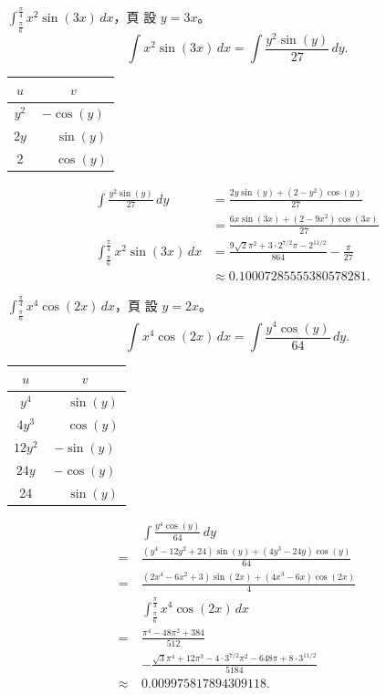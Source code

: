 \documentclass{beamer}
\newcommand{\Cdot} {\!\cdot\!}
\theoremstyle{remark}
\begin{document}
\begin{CJK}{UTF8}{bsmi}
\begin{frame}[allowframebreaks]{$\displaystyle \int_{\frac\pi6}^{\frac\pi4} x^2 \sin(3x)\,dx$，頁}
  設 $y = 3x$。
  \[\int x^2 \sin(3x)\,dx = \int \frac{y^2 \sin(y)}{27}\,dy.\]
  \begin{center}
    \begin{tabular}{cc}
      $u$  & $v$\\
      \hline
      $y^2$& $        -\cos(y)$\\
      $2y$ & $\phantom+\sin(y)$\\
      2    & $\phantom+\cos(y)$
    \end{tabular}
  \end{center}
  \begin{align*}
    \int \frac{y^2 \sin(y)}{27}\,dy &= \frac{2y \sin(y) + \left( 2 - y^2 \right) \cos(y)}{27}\\
      &= \frac{6x \sin(3x) + \left( 2 - 9x^2 \right) \cos(3x)}{27}\\
    \int_{\frac\pi6}^{\frac\pi4} x^2 \sin(3x)\,dx &= \frac{9\sqrt2\pi^2 + 3\Cdot2^{7/2}\pi - 2^{11/2}}{864}
	- \frac{\pi}{27}\\
      &\approx 0.10007285555380578281.
  \end{align*}
\end{frame}

\begin{frame}[allowframebreaks]{$\displaystyle \int_{\frac\pi6}^{\frac\pi4} x^4 \cos(2x)\,dx$，頁}
  設 $y = 2x$。
  \[\int x^4 \cos(2x)\,dx = \int \frac{y^4 \cos(y)}{64}\,dy.\]
  \begin{center}
    \begin{tabular}{cc}
      $u$  & $v$\\
      \hline
      $y^4$  & $\phantom+\sin(y)$\\
      $4y^3$ & $\phantom+\cos(y)$\\
      $12y^2$& $        -\sin(y)$\\
      $24y$  & $        -\cos(y)$\\
      24     & $\phantom+\sin(y)$
    \end{tabular}
  \end{center}
  \begin{align*}
       & \int \frac{y^4 \cos(y)}{64}\,dy\\
    =\:& \frac{\left( y^4 - 12y^2 + 24 \right) \sin(y) + \left( 4y^3 - 24y \right) \cos(y)}{64}\\
    =\:& \frac{\left( 2x^4 - 6x^2 + 3 \right) \sin(2x) + \left( 4x^3 - 6x \right) \cos(2x)}{4}\\
       & \int_{\frac\pi6}^{\frac\pi4} x^4 \cos(2x)\,dx\\
    =\:& \frac{\pi^4 - 48\pi^2 + 384}{512}\\
    \phantom=\:& -\frac{\sqrt3\pi^4 + 12\pi^3 - 4\Cdot3^{7/2}\pi^2 - 648\pi + 8\Cdot3^{11/2}}{5184}\\
    \approx\:& 0.009975817894309118.
  \end{align*}
\end{frame}


\end{CJK}
\end{document}
